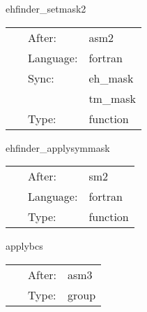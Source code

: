 \vspace{5mm}


\hspace{5mm} ehfinder\_setmask2 

\hspace{5mm}{\it find excision boundaries } 


\hspace{5mm}

 \begin{tabular*}{160mm}{cll} 
~ & After:  & asm2 \\ 
~ & Language:  & fortran \\ 
~ & Sync:  & eh\_mask \\ 
~& ~ &tm\_mask\\ 
~ & Type:  & function \\ 
\end{tabular*} 


\vspace{5mm}


\hspace{5mm} ehfinder\_applysymmask 

\hspace{5mm}{\it select eh\_mask for boundary conditions } 


\hspace{5mm}

 \begin{tabular*}{160mm}{cll} 
~ & After:  & sm2 \\ 
~ & Language:  & fortran \\ 
~ & Type:  & function \\ 
\end{tabular*} 


\vspace{5mm}


\hspace{5mm} applybcs 

\hspace{5mm}{\it apply boundary conditions (symmetries) } 


\hspace{5mm}

 \begin{tabular*}{160mm}{cll} 
~ & After:  & asm3 \\ 
~ & Type:  & group \\ 
\end{tabular*} 


